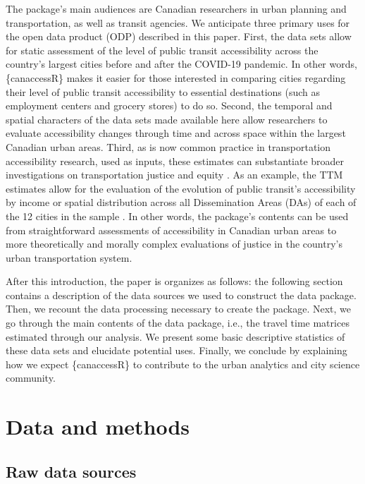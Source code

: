 \documentclass[Royal,times,sageh]{sagej}
\begin{document}
The package's main audiences are Canadian researchers in urban planning
and transportation, as well as transit agencies. We anticipate three
primary uses for the open data product (ODP) described in this paper.
First, the data sets allow for static assessment of the level of public
transit accessibility across the country's largest cities before and
after the COVID-19 pandemic. In other words, \{canaccessR\} makes it
easier for those interested in comparing cities regarding their level of
public transit accessibility to essential destinations (such as
employment centers and grocery stores) to do so. Second, the temporal
and spatial characters of the data sets made available here allow
researchers to evaluate accessibility changes through time and across
space within the largest Canadian urban areas. Third, as is now common
practice in transportation accessibility research, used as inputs, these
estimates can substantiate broader investigations on transportation
justice and equity
\citep{higginsChangesAccessibilityEmergency2021, humbertoHowTranslateJustice2023, pereiraGeographicAccessCOVID192021}.
As an example, the TTM estimates allow for the evaluation of the
evolution of public transit's accessibility by income or spatial
distribution across all Dissemination Areas (DAs) of each of the 12
cities in the sample \citep{pargaDemocraticAccessOur2024}. In other
words, the package's contents can be used from straightforward
assessments of accessibility in Canadian urban areas to more
theoretically and morally complex evaluations of justice in the
country's urban transportation system.

After this introduction, the paper is organizes as follows: the
following section contains a description of the data sources we used to
construct the data package. Then, we recount the data processing
necessary to create the package. Next, we go through the main contents
of the data package, i.e., the travel time matrices estimated through
our analysis. We present some basic descriptive statistics of these data
sets and elucidate potential uses. Finally, we conclude by explaining
how we expect \{canaccessR\} to contribute to the urban analytics and
city science community.

\section{Data and methods}\label{data-and-methods}

\subsection{Raw data sources}\label{raw-data-sources}
\end{document}
